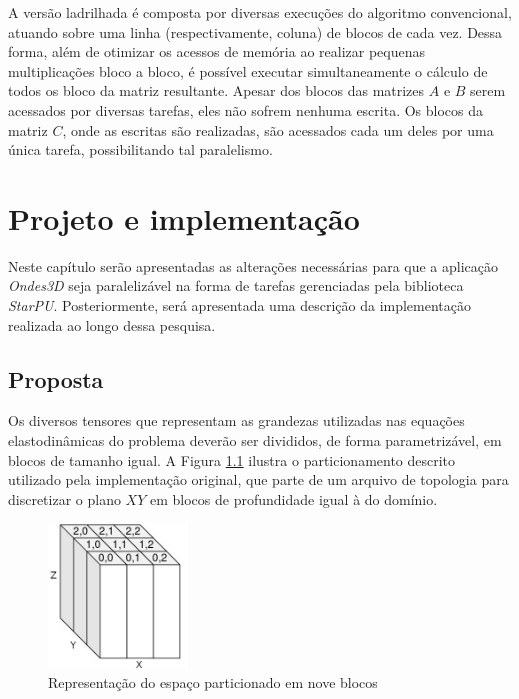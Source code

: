 \documentclass[cic,tc]{iiufrgs}
\begin{document}
A versão ladrilhada é composta por diversas execuções do algoritmo convencional, atuando sobre uma linha (respectivamente, coluna) de blocos de cada vez. Dessa forma, além de otimizar os
acessos de memória ao realizar pequenas multiplicações bloco a bloco, é possível executar simultaneamente o cálculo de todos os bloco da matriz resultante. Apesar dos blocos das matrizes
$A$ e $B$ serem acessados por diversas tarefas, eles não sofrem nenhuma escrita. Os blocos da matriz $C$, onde as escritas são realizadas, são acessados cada um deles por uma única tarefa,
possibilitando tal paralelismo.

\chapter{Projeto e implementação}
Neste capítulo serão apresentadas as alterações necessárias para que a aplicação \textit{Ondes3D} seja paralelizável na forma de tarefas gerenciadas pela biblioteca \textit{StarPU}.
Posteriormente, será apresentada uma descrição da implementação realizada ao longo dessa pesquisa.

\section{Proposta}\label{sec:proposal}

Os diversos tensores que representam as grandezas utilizadas nas equações elastodinâmicas do problema deverão ser divididos, de forma parametrizável, em blocos de tamanho igual.
A Figura \ref{fig:cuboids} ilustra o particionamento descrito utilizado pela implementação original, que parte de um arquivo de topologia para discretizar o plano $XY$ em blocos de profundidade
igual à do domínio.

\begin{figure}[!htb]
    \caption{Representação do espaço particionado em nove blocos}
    \begin{center}
      \includegraphics[width=10em]{cuboids}
    \end{center}
    \label{fig:cuboids}
\end{figure}
\end{document}
